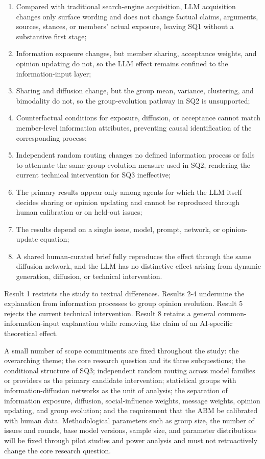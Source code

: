 \documentclass[11pt,a4paper]{article}
\begin{document}
\begin{enumerate}
\item Compared with traditional search-engine acquisition, LLM acquisition changes only surface wording and does not change factual claims, arguments, sources, stances, or members' actual exposure, leaving SQ1 without a substantive first stage;
\item Information exposure changes, but member sharing, acceptance weights, and opinion updating do not, so the LLM effect remains confined to the information-input layer;
\item Sharing and diffusion change, but the group mean, variance, clustering, and bimodality do not, so the group-evolution pathway in SQ2 is unsupported;
\item Counterfactual conditions for exposure, diffusion, or acceptance cannot match member-level information attributes, preventing causal identification of the corresponding process;
\item Independent random routing changes no defined information process or fails to attenuate the same group-evolution measure used in SQ2, rendering the current technical intervention for SQ3 ineffective;
\item The primary results appear only among agents for which the LLM itself decides sharing or opinion updating and cannot be reproduced through human calibration or on held-out issues;
\item The results depend on a single issue, model, prompt, network, or opinion-update equation;
\item A shared human-curated brief fully reproduces the effect through the same diffusion network, and the LLM has no distinctive effect arising from dynamic generation, diffusion, or technical intervention.
\end{enumerate}

Result 1 restricts the study to textual differences. Results 2-4 undermine the explanation from information processes to group opinion evolution. Result 5 rejects the current technical intervention. Result 8 retains a general common-information-input explanation while removing the claim of an AI-specific theoretical effect.

A small number of scope commitments are fixed throughout the study: the overarching theme; the core research question and its three subquestions; the conditional structure of SQ3; independent random routing across model families or providers as the primary candidate intervention; statistical groups with information-diffusion networks as the unit of analysis; the separation of information exposure, diffusion, social-influence weights, message weights, opinion updating, and group evolution; and the requirement that the ABM be calibrated with human data. Methodological parameters such as group size, the number of issues and rounds, base model versions, sample size, and parameter distributions will be fixed through pilot studies and power analysis and must not retroactively change the core research question.
\end{document}

